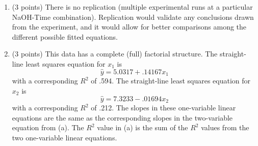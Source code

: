 \documentclass{article}\usepackage[]{graphicx}\usepackage[]{color}
\begin{document}
\begin{enumerate}
\begin{enumerate}
  \item (3 points) There is no replication (multiple experimental runs at a particular NaOH-Time combination). Replication would validate any conclusions drawn from the experiment, and it would allow for better comparisons among the different possible fitted equations.
  
  \item (3 points)
  This data has a complete (full) factorial structure. The straight-line least squares equation for $x_1$ is 
  \[\hat{y} = 5.0317 + .14167 x_1\]
  with a corresponding $R^2$ of .594. The straight-line least squares equation for $x_2$ is
  \[\hat{y} = 7.3233 - .01694 x_2\]
  with a corresponding $R^2$ of .212. The slopes in these one-variable linear equations are the same as the corresponding slopes in the two-variable equation from (a). The $R^2$ value in (a) is the sum of the $R^2$ values from the two one-variable linear equations.
  \end{enumerate}
\end{enumerate}
% 
%
\end{document}
